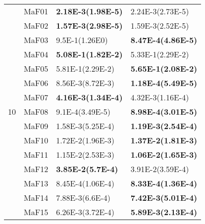 \documentclass[]{article}
\begin{document}
\begin{table}
\begin{footnotesize}
\begin{tabular}{|l|l|l|l|}
\multirow{15}{*}{10} & MaF01 & \cellcolor{gray95} {\bf 2.18E-3(1.98E-5)} & 2.24E-3(2.73E-5)\\
 & MaF02 & \cellcolor{gray95} {\bf 1.57E-3(2.98E-5)} & 1.59E-3(2.52E-5)\\
 & MaF03 & 9.5E-1(1.26E0) & \cellcolor{gray95} {\bf 8.47E-4(4.86E-5)}\\
 & MaF04 & \cellcolor{gray95} {\bf 5.08E-1(1.82E-2)} & 5.33E-1(2.29E-2)\\
 & MaF05 & 5.81E-1(2.29E-2) & \cellcolor{gray95} {\bf 5.65E-1(2.08E-2)}\\
 & MaF06 & 8.56E-3(8.72E-3) & \cellcolor{gray95} {\bf 1.18E-4(5.49E-5)}\\
 & MaF07 & \cellcolor{gray95} {\bf 4.16E-3(1.34E-4)} & 4.32E-3(1.16E-4)\\
 & MaF08 & \cellcolor{gray95} 9.1E-4(3.49E-5) & \cellcolor{gray95} {\bf 8.98E-4(3.01E-5)}\\
 & MaF09 & 1.58E-3(5.25E-4) & \cellcolor{gray95} {\bf 1.19E-3(2.54E-4)}\\
 & MaF10 & 1.72E-2(1.96E-3) & \cellcolor{gray95} {\bf 1.37E-2(1.81E-3)}\\
 & MaF11 & \cellcolor{gray95} 1.15E-2(2.53E-3) & \cellcolor{gray95} {\bf 1.06E-2(1.65E-3)}\\
 & MaF12 & \cellcolor{gray95} {\bf 3.85E-2(5.7E-4)} & 3.91E-2(3.59E-4)\\
 & MaF13 & \cellcolor{gray95} 8.45E-4(1.06E-4) & \cellcolor{gray95} {\bf 8.33E-4(1.36E-4)}\\
 & MaF14 & 7.88E-3(6.6E-4) & \cellcolor{gray95} {\bf 7.42E-3(5.01E-4)}\\
 & MaF15 & 6.26E-3(3.72E-4) & \cellcolor{gray95} {\bf 5.89E-3(2.13E-4)}\\
\hline


\end{tabular}
\end{footnotesize}
\end{table}
\end{document}
